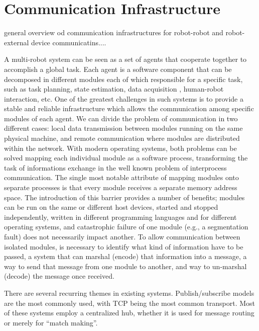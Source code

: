 \section{Communication Infrastructure}

general overview od communication infrastructures for robot-robot and robot-external device communicatins....




A multi-robot system can be seen as a set of agents that cooperate together to accomplish a global task. Each agent is a software component that can be decomposed in different modules each of which responsible for a specific task, such as task planning, state estimation, data acquisition , human-robot interaction, etc. 
One of the greatest challenges in such systems is to provide a stable and reliable infrastructure which allows the communication among specific modules of each agent.
We can divide the problem of communication in two different cases: local data transmission between  modules running on the same physical machine, and remote communication where modules are distributed within the network.
With modern operating systems, both problems can be solved mapping each individual module as a software process, transforming the task of informations exchange in the well known problem of interprocess communication.
The single most notable attribute of mapping modules onto separate processes is that every module receives a separate memory address space. The introduction of this barrier provides a number of benefits; modules can be run on the same or different host devices, started and stopped independently, written in different programming languages and for different operating systems, and catastrophic failure of one module (e.g., a segmentation fault) does not necessarily impact another. To allow communication between isolated modules, is necessary to identify what kind of information have to be passed,  a system that can marshal (encode) that information into a message, a way to send that message from one module to another, and way to un-marshal (decode) the message once received.

There are several recurring themes in existing systems. Publish/subscribe models are the most commonly used, with TCP being the most common transport. Most of these systems employ a centralized hub, whether it is used for message routing or merely for “match making”. 

